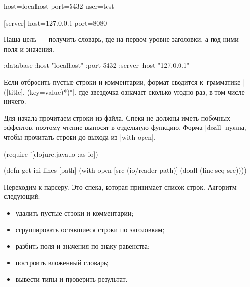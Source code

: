 \begin{english}
  \begin{ini}
[database]
host=localhost
port=5432
user=test

[server]
host=127.0.0.1
port=8080
  \end{ini}
\end{english}

Наша цель~--- получить словарь, где на первом уровне заголовки, а под ними поля
и значения.

\begin{english}
  \begin{clojure}
{:database {:host "localhost"
            :port 5432}
 :server {:host "127.0.0.1"}}
  \end{clojure}
\end{english}

Если отбросить пустые строки и комментарии, формат сводится к~грамматике
\spverb|([title], (key=value)*)*|, где звездочка означает сколько угодно раз, в
том числе ничего.


Для начала прочитаем строки из файла. Спеки не должны иметь побочных эффектов,
поэтому чтение выносят в отдельную функцию. Форма \spverb|doall| нужна, чтобы
прочитать строки до выхода из \spverb|with-open|.

\begin{english}
  \begin{clojure}
(require '[clojure.java.io :as io])

(defn get-ini-lines [path]
  (with-open [src (io/reader path)]
    (doall (line-seq src))))
  \end{clojure}
\end{english}

Переходим к парсеру. Это спека, которая принимает список строк. Алгоритм
следующий:

\begin{itemize}

\item
  удалить пустые строки и комментарии;

\item
  сгруппировать оставшиеся строки по заголовкам;

\item
  разбить поля и значения по знаку равенства;

\item
  построить вложенный словарь;

\item
  вывести типы и проверить результат.

\end{itemize}

